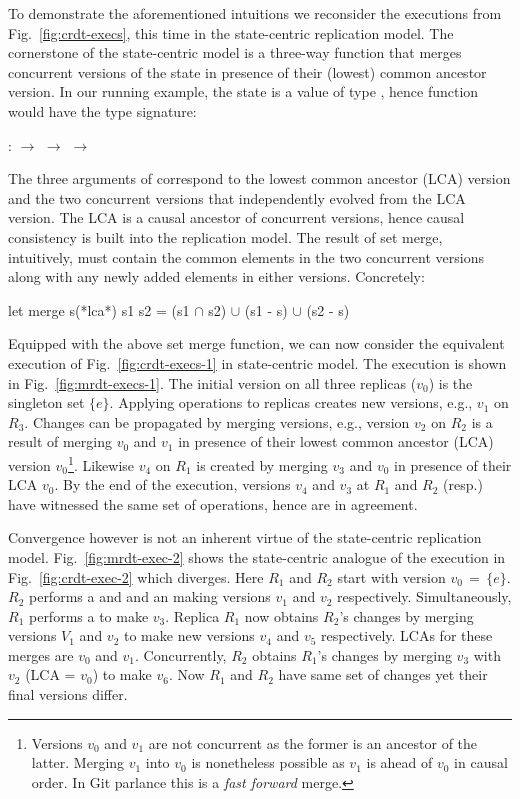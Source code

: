 To demonstrate the aforementioned intuitions we reconsider the
executions from Fig.~\ref{fig:crdt-execs}, this time in the
state-centric replication model. The cornerstone of the state-centric
model is a three-way  function that merges concurrent
versions of the state in presence of their (lowest) common ancestor
version. In our running example, the state is a value of type
, hence  function would have the type signature:
\begin{center}
 :  $\rightarrow$  $\rightarrow$ 
$\rightarrow$ 
\end{center}
The three arguments of  correspond to the lowest common
ancestor (LCA) version and the two concurrent versions that
independently evolved from the LCA version. The LCA is a causal
ancestor of concurrent versions, hence causal consistency is built
into the replication model. The result of set merge, intuitively, must
contain the common elements in the two concurrent versions along with
any newly added elements in either versions. Concretely:
\begin{ocaml}
  let merge s(*lca*) s1 s2 = 
              (s1 $\cap$ s2) $\cup$ (s1 - s) $\cup$ (s2 - s)
\end{ocaml}
Equipped with the above set merge function, we can now consider the
equivalent execution of Fig.~\ref{fig:crdt-execs-1} in state-centric
model. The execution is shown in Fig.~\ref{fig:mrdt-execs-1}. The
initial version on all three replicas ($v_0$) is the singleton set
$\{e\}$. Applying operations to replicas creates new versions, e.g.,
$v_1$ on $R_3$. Changes can be propagated by merging versions, e.g.,
version $v_2$ on $R_2$ is a result of merging $v_0$ and $v_1$ in
presence of their lowest common ancestor (LCA) version
$v_0$\footnote{Versions $v_0$ and $v_1$ are not concurrent as the
  former is an ancestor of the latter. Merging $v_1$ into $v_0$ is
  nonetheless possible as $v_1$ is ahead of $v_0$ in causal order. In
  Git parlance this is a \emph{fast forward} merge.}.
Likewise $v_4$ on $R_1$ is created by merging $v_3$ and $v_0$ in
presence of their LCA $v_0$. By the end of the execution, versions
$v_4$ and $v_3$ at $R_1$ and $R_2$ (resp.) have witnessed the same set
of operations, hence are in agreement.

Convergence however is not an inherent virtue of the state-centric
replication model. Fig.~\ref{fig:mrdt-exec-2} shows the state-centric
analogue of the execution in Fig.~\ref{fig:crdt-exec-2} which
diverges. Here $R_1$ and $R_2$ start with version $v_0 \,=\, \{e\}$.
$R_2$ performs a  and and an  making versions
$v_1$ and $v_2$ respectively. Simultaneously, $R_1$ performs a
 to make $v_3$. Replica $R_1$ now obtains $R_2$'s changes by
merging versions $V_1$ and $v_2$ to make new versions $v_4$ and $v_5$
respectively. LCAs for these merges are $v_0$ and $v_1$. Concurrently,
$R_2$ obtains $R_1$'s changes by merging $v_3$ with $v_2$ (LCA =
$v_0$) to make $v_6$.  Now $R_1$ and $R_2$ have same set of changes
yet their final versions differ.

